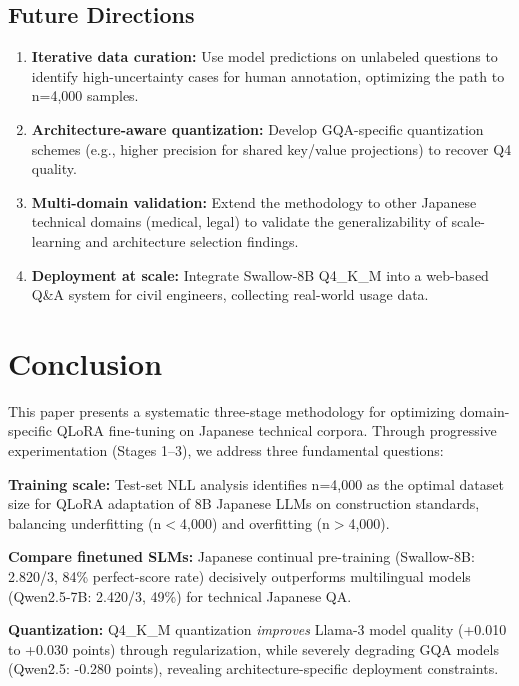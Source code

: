 \documentclass[twocolumn]{article}
\begin{document}
\subsection{Future Directions}

\begin{enumerate}
  \item \textbf{Iterative data curation:} Use model predictions on unlabeled questions
        to identify high-uncertainty cases for human annotation, optimizing the path to
        n=4,000 samples.
  \item \textbf{Architecture-aware quantization:} Develop GQA-specific quantization schemes
        (e.g., higher precision for shared key/value projections) to recover Q4 quality.
  \item \textbf{Multi-domain validation:} Extend the methodology to other Japanese technical
        domains (medical, legal) to validate the generalizability of scale-learning and
        architecture selection findings.
  \item \textbf{Deployment at scale:} Integrate Swallow-8B Q4\_K\_M into a web-based
        Q\&A system for civil engineers, collecting real-world usage data.
\end{enumerate}

\section{Conclusion}
\label{sec:conclusion}

This paper presents a systematic three-stage methodology for optimizing domain-specific
QLoRA fine-tuning on Japanese technical corpora. Through progressive experimentation
(Stages 1--3), we address three fundamental questions:

\textbf{Training scale:} Test-set NLL analysis identifies n=4,000 as the optimal
dataset size for QLoRA adaptation of 8B Japanese LLMs on construction standards, balancing
underfitting (n$<$4,000) and overfitting (n$>$4,000).

\textbf{Compare finetuned SLMs:} Japanese continual pre-training (Swallow-8B: 2.820/3,
84\% perfect-score rate) decisively outperforms multilingual models
(Qwen2.5-7B: 2.420/3, 49\%) for technical Japanese QA.

\textbf{Quantization:} Q4\_K\_M quantization \emph{improves} Llama-3 model
quality (+0.010 to +0.030 points) through regularization, while severely degrading
GQA models (Qwen2.5: -0.280 points), revealing architecture-specific deployment
constraints.
\end{document}

